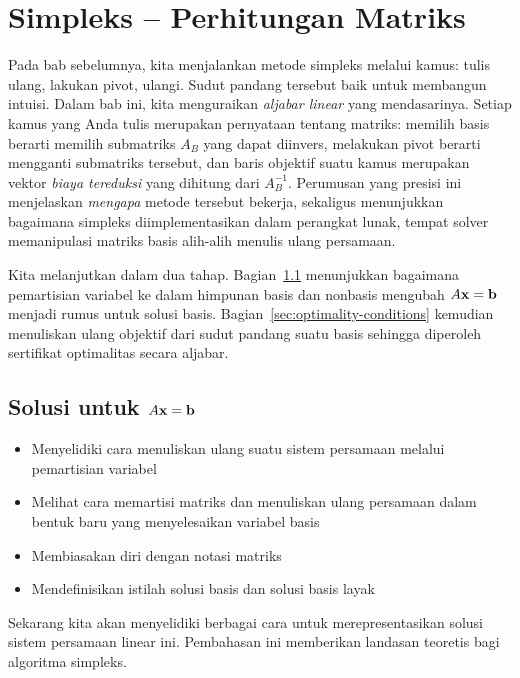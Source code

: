 \chapter{Simpleks -- Perhitungan Matriks}
\label{ch:simplex-matrix}

Pada bab sebelumnya, kita menjalankan metode simpleks melalui kamus: tulis ulang, lakukan pivot, ulangi.  Sudut pandang tersebut baik untuk membangun intuisi.  Dalam bab ini, kita menguraikan \emph{aljabar linear} yang mendasarinya.  Setiap kamus yang Anda tulis merupakan pernyataan tentang matriks: memilih basis berarti memilih submatriks $A_B$ yang dapat diinvers, melakukan pivot berarti mengganti submatriks tersebut, dan baris objektif suatu kamus merupakan vektor \emph{biaya tereduksi} yang dihitung dari $A_B^{-1}$.  Perumusan yang presisi ini menjelaskan \emph{mengapa} metode tersebut bekerja, sekaligus menunjukkan bagaimana simpleks diimplementasikan dalam perangkat lunak, tempat solver memanipulasi matriks basis alih-alih menulis ulang persamaan.

Kita melanjutkan dalam dua tahap.  Bagian~\ref{sec:solutions-axb} menunjukkan bagaimana pemartisian variabel ke dalam himpunan basis dan nonbasis mengubah $A\mathbf{x} = \mathbf{b}$ menjadi rumus untuk solusi basis.  Bagian~\ref{sec:optimality-conditions} kemudian menuliskan ulang objektif dari sudut pandang suatu basis sehingga diperoleh sertifikat optimalitas secara aljabar.

\section{Solusi untuk $A\mathbf{x} = \mathbf{b}$}
\label{sec:solutions-axb}
\begin{outcome}
\begin{itemize}
\item Menyelidiki cara menuliskan ulang suatu sistem persamaan melalui pemartisian variabel
\item Melihat cara memartisi matriks dan menuliskan ulang persamaan dalam bentuk baru yang menyelesaikan variabel basis
\item Membiasakan diri dengan notasi matriks
\item Mendefinisikan istilah solusi basis dan solusi basis layak
\end{itemize}
\end{outcome}
Sekarang kita akan menyelidiki berbagai cara untuk merepresentasikan solusi sistem persamaan linear ini.  Pembahasan ini memberikan landasan teoretis bagi algoritma simpleks.  

